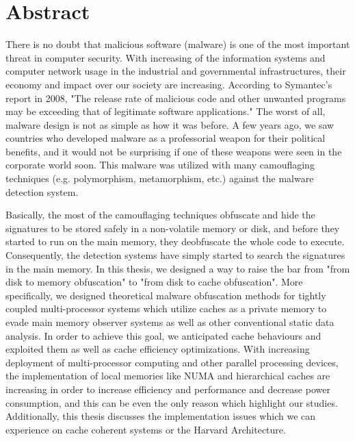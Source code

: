 \documentclass[medieteknikk]{gucmasterthesis}
\begin{document}
	\thesisdate{\gucmasterthesisdate}
\makefrontpages %
\thesistitlepage %


\chapter*{Abstract}

There is no doubt that malicious software (malware) is one of the most important threat in computer security. With increasing of the information systems and computer network usage in the industrial and governmental infrastructures, their economy and impact over our society are increasing. According to Symantec's report in 2008\cite{turner2008symantec}, "The release rate of malicious code and other unwanted programs may be exceeding that of legitimate software applications." The worst of all, malware design is not as simple as how it was before. A few years ago, we saw countries who developed malware as a professorial weapon for their political benefits, and it would not be surprising if one of these weapons were seen in the corporate world soon. This malware was utilized with many camouflaging techniques (e.g. polymorphism, metamorphism, etc.) against the malware detection system.

Basically, the most of the camouflaging techniques obfuscate and hide the signatures to be stored safely in a non-volatile memory or disk, and before they started to run on the main memory, they deobfuscate the whole code to execute. Consequently, the detection systems have simply started to search the signatures in the main memory. In this thesis, we designed a way to raise the bar from "from disk to memory obfuscation" to "from disk to cache obfuscation". More specifically, we designed theoretical malware obfuscation methods for tightly coupled multi-processor systems which utilize caches as a private memory to evade main memory observer systems as well as other conventional static data analysis. In order to achieve this goal, we anticipated cache behaviours and exploited them as well as cache efficiency optimizations. With increasing deployment of multi-processor computing and other parallel processing devices, the implementation of local memories like NUMA and hierarchical caches are increasing in order to increase efficiency and performance and decrease power consumption, and this can be even the only reason which highlight our studies. Additionally, this thesis discusses the implementation issues which we can experience on cache coherent systems or the Harvard Architecture.
\end{document}
